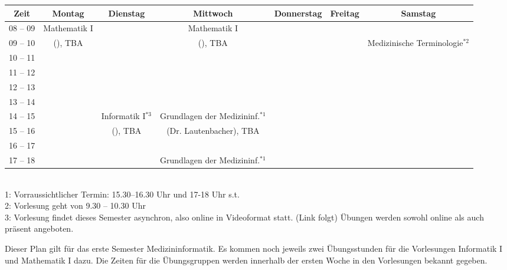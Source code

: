 \begin{minipage}{\textwidth}
    \footnotesize
\begin{center}
	\begin{tabular}{|c|c|c|c|c|c|c|}
	\hline
	 Zeit     &    Montag                    & Dienstag          & Mittwoch               	  	& Donnerstag & Freitag 	& Samstag\\ \hline\hline
	 08 -- 09 &    Mathematik I              &                   & Mathematik I      	  	&  &  			&\\ \cline{1-1} \cline{3-3} \cline{5-7} 
	 09 -- 10 &    (\Matheprof), TBA         &                   & (\Matheprof), TBA 	  	&  &  		       	& Medizinische Terminologie$^{*2}$\\ \hline
	 10 -- 11 &                              &                   &                   	  	&  &  			&\\ \cline{1-1} \cline{3-7} 
	 11 -- 12 &                              &                   &                   	  	&  &  			&\\ \hline
	 12 -- 13 &                              &                   &                   	  	&  &  			&\\ \hline
	 13 -- 14 &                              &                   &                   	  	&  &  			&\\ \hline
	 14 -- 15 &                              & Informatik I$^{*3}$  & Grundlagen der Medizininf.$^{*1}$&  &  			&\\ \cline{1-2} \cline{4-7} 
	 15 -- 16 &                              & (\Infoprof), TBA  & (Dr. Lautenbacher), TBA    	&  &  			&\\ \cline{1-3} \cline{5-7}
	 16 -- 17 &                              &                   &                   	  	&  &  			&\\ \hline
	 17 -- 18 &                              &                   & Grundlagen der Medizininf.$^{*1}$&  &  			&\\ \hline
	\end{tabular}
    ~\\
\scriptsize %
1: Vorraussichtlicher Termin: 15.30--16.30 Uhr und 17-18 Uhr s.t.\\
2: Vorlesung geht von 9.30 -- 10.30 Uhr\\
3: Vorlesung findet dieses Semester asynchron, also online in Videoformat statt. (Link folgt) Übungen werden sowohl online als auch präsent angeboten.
\end{center}
\end{minipage}
Dieser Plan gilt für das erste Semester Medizininformatik. Es kommen noch jeweils zwei Übungsstunden für die Vorlesungen 
Informatik I und Mathematik I dazu. Die Zeiten für die Übungsgruppen werden innerhalb der ersten Woche in den Vorlesungen bekannt gegeben.

